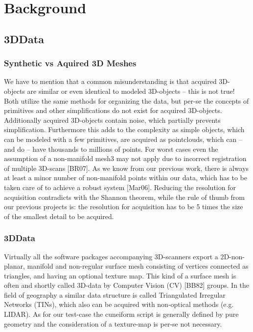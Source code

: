 \chapter{Background}
\section{3DData}
\subsection{Synthetic vs Aquired 3D Meshes}
We have to mention that a common misunderstanding is that acquired 3D-objects
are similar or even identical to modeled 3D-objects – this is not true! 
Both utilize the same methods for organizing the data, but per-se the concepts 
of primitives and other simplifications do not exist for acquired 3D-objects. 
Additionally acquired 3D-objects contain noise, which partially prevents 
simplification. Furthermore this adds to the complexity as simple objects, 
which can be modeled with a few primitives, are acquired as pointclouds, which 
can – and do – have thousands to millions of points. For worst cases even the 
assumption of a non-manifold mesh3 may not apply due to incorrect registration 
of multiple 3D-scans [BR07]. As we know from our previous work, there is always 
at least a minor number of non-manifold points within our data, which has to be 
taken care of to achieve a robust system [Mar06]. Reducing the resolution for 
acquisition contradicts with the Shannon theorem, while the rule of thumb from 
our previous projects is: the resolution for acquisition has to be 5 times the 
size of the smallest detail to be acquired.~\cite[p.~25]{Mara12}
%
\subsection{3DData}
Virtually all the software packages accompanying 3D-scanners export
a 2D-non-planar, manifold and non-regular surface mesh consisting of vertices 
connected as triangles, and having an optional texture map. This kind of a
surface mesh is often and shortly called 3D-data by Computer Vision (CV) [BB82]
groups. In the field of geography a similar data structure is called
Triangulated Irregular Networks (TINs), which also can be acquired with
non-optical methods (e.g. LIDAR). As for our test-case the cuneiform script is
generally defined by pure geometry and the consideration of a texture-map is
per-se not necessary.~\cite[p.~25]{Mara12}
%
